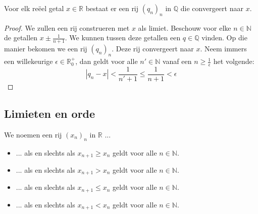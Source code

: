 \documentclass[main.tex]{subfiles}
\begin{document}
\begin{pr}
  Voor elk re\"eel getal $x\in \mathbb{R}$ bestaat er een rij $(q_{n})_{n}$ in $\mathbb{Q}$ die convergeert naar $x$.

  \begin{proof}
    We zullen een rij construeren met $x$ als limiet.
    Beschouw voor elke $n\in \mathbb{N}$ de getallen $x\pm \frac{1}{n+1}$.
    We kunnen tussen deze getallen een $q\in \mathbb{Q}$ vinden.
    Op die manier bekomen we een rij $(q_{n})_{n}$.
    Deze rij convergeert naar $x$.
    Neem immers een willekeurige $\epsilon \in \mathbb{R}_{0}^{+}$, dan geldt voor alle $n'\in\mathbb{N}$ vanaf een $n \ge \frac{1}{\epsilon}$ het volgende:
    \[ |q_{n}-x| < \frac{1}{n'+1} \le \frac{1}{n+1} < \epsilon \]
  \end{proof}
\end{pr}

\subsection{Limieten en orde}
\label{sec:limieten-en-orde}


\begin{de}
  We noemen een rij $(x_{n})_{n}$ in $\mathbb{R}$ ...
  \begin{itemize}
  \item ...  als en slechts als $x_{n+1} \ge x_{n}$ geldt voor alle $n\in \mathbb{N}$.  
  \item ...  als en slechts als $x_{n+1} > x_{n}$ geldt voor alle $n\in \mathbb{N}$.  
  \item ...  als en slechts als $x_{n+1} \le x_{n}$ geldt voor alle $n\in \mathbb{N}$.  
  \item ...  als en slechts als $x_{n+1} < x_{n}$ geldt voor alle $n\in \mathbb{N}$.  
  \end{itemize}
\end{de}
\end{document}

